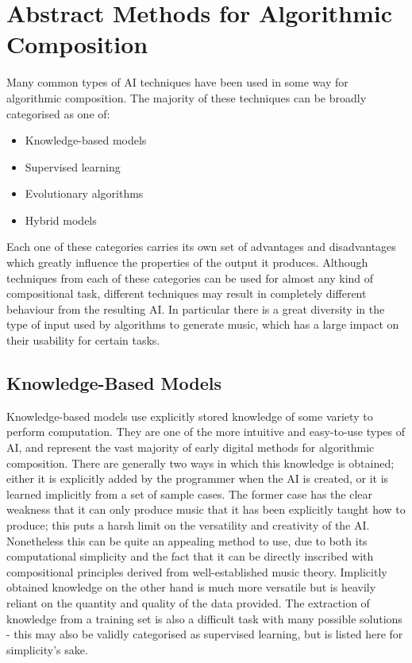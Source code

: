 \documentclass[ author={Stephen Livermore-Tozer},
				supervisor={Dr. Peter Flach},
				degree={MEng},
				title={Algorithmic Co-composition Using Machine Learning},
				subtitle={},
				type={research},
				year={2016} ]{dissertation}
\begin{document}
	\section{Abstract Methods for Algorithmic Composition}
	\label{sec:abstract-methods}
	
	Many common types of AI techniques have been used in some way for algorithmic composition. The majority of these techniques can be broadly categorised as one of:
	\begin{itemize}
		\item Knowledge-based models
		\item Supervised learning
		\item Evolutionary algorithms
		\item Hybrid models
	\end{itemize}
	Each one of these categories carries its own set of advantages and disadvantages which greatly influence the properties of the output it produces. Although techniques from each of these categories can be used for almost any kind of compositional task, different techniques may result in completely different behaviour from the resulting AI. In particular there is a great diversity in the type of input used by algorithms to generate music, which has a large impact on their usability for certain tasks. 
	
	\subsection{Knowledge-Based Models}
	\label{sec:knowledge-systems}
	
	Knowledge-based models use explicitly stored knowledge of some variety to perform computation. They are one of the more intuitive and easy-to-use types of AI, and represent the vast majority of early digital methods for algorithmic composition. There are generally two ways in which this knowledge is obtained; either it is explicitly added by the programmer when the AI is created, or it is learned implicitly from a set of sample cases. The former case has the clear weakness that it can only produce music that it has been explicitly taught how to produce; this puts a harsh limit on the versatility and creativity of the AI. Nonetheless this can be quite an appealing method to use, due to both its computational simplicity and the fact that it can be directly inscribed with compositional principles derived from well-established music theory. Implicitly obtained knowledge on the other hand is much more versatile but is heavily reliant on the quantity and quality of the data provided. The extraction of knowledge from a training set is also a difficult task with many possible solutions - this may also be validly categorised as supervised learning, but is listed here for simplicity's sake. 
	
\end{document}
